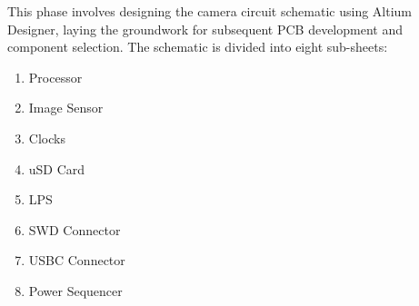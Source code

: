 This phase involves designing the camera circuit schematic using Altium Designer, laying the groundwork for subsequent PCB development and component selection.
\nl
The schematic is divided into eight sub-sheets:
\begin{enumerate}[noitemsep]
    \item Processor
    \item Image Sensor
    \item Clocks
    \item uSD Card
    \item LPS
    \item SWD Connector
    \item USBC Connector
    \item Power Sequencer
\end{enumerate}
